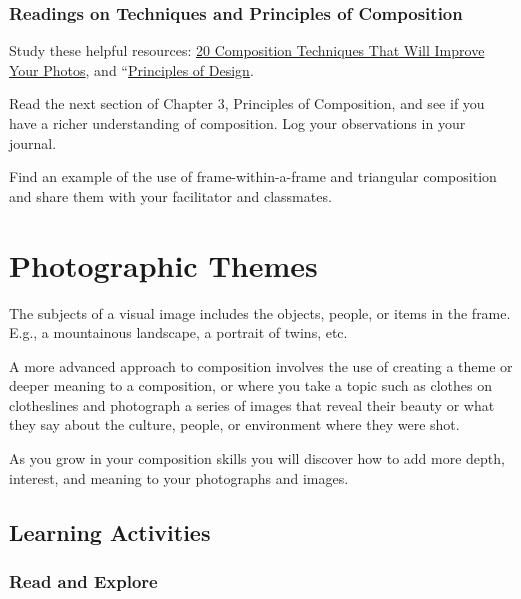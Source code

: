 \documentclass[
]{book}
\begin{document}
\hypertarget{readings-on-techniques-and-principles-of-composition}{%
\subsubsection*{Readings on Techniques and Principles of Composition}\label{readings-on-techniques-and-principles-of-composition}}

Study these helpful resources: \href{https://petapixel.com/2016/09/14/20-composition-techniques-will-improve-photos/}{20 Composition Techniques That Will Improve Your Photos}, and ``\href{https://www.getty.edu/education/teachers/building_lessons/principles_design.pdf}{Principles of Design}.

Read the next section of Chapter 3, Principles of Composition, and see if you have a richer understanding of composition. Log your observations in your journal.

Find an example of the use of frame-within-a-frame and triangular composition and share them with your facilitator and classmates.

\hypertarget{photographic-themes}{%
\section{Photographic Themes}\label{photographic-themes}}

The subjects of a visual image includes the objects, people, or items in the frame. E.g., a mountainous landscape, a portrait of twins, etc.

A more advanced approach to composition involves the use of creating a theme or deeper meaning to a composition, or where you take a topic such as clothes on clotheslines and photograph a series of images that reveal their beauty or what they say about the culture, people, or environment where they were shot.

As you grow in your composition skills you will discover how to add more depth, interest, and meaning to your photographs and images.

\hypertarget{learning-activities-9}{%
\subsection*{Learning Activities}\label{learning-activities-9}}

\hypertarget{read-and-explore}{%
\subsubsection*{Read and Explore}\label{read-and-explore}}
\end{document}
